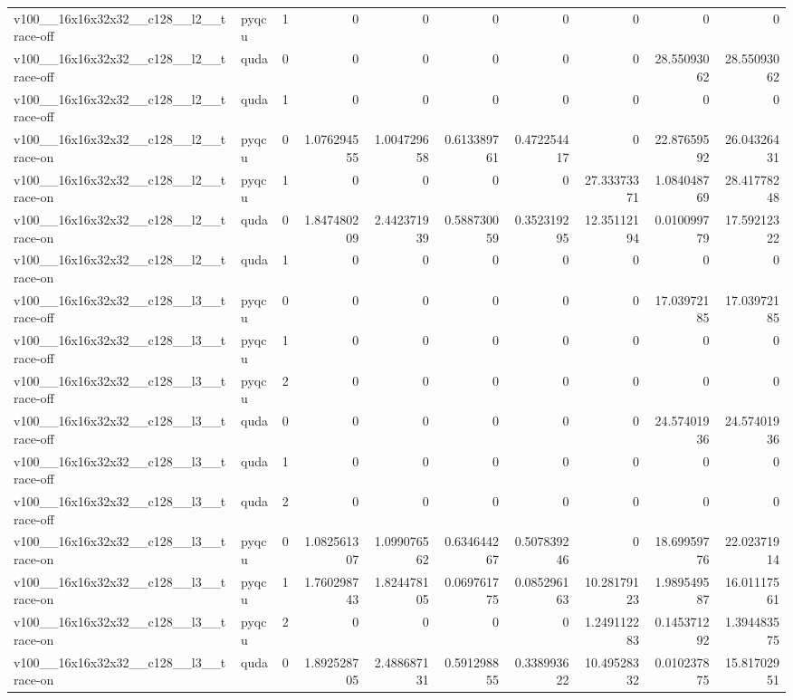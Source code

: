 \begin{table}[htbp]
\begin{tabular}{@{}llrrrrrrrr@{}}
v100\_\_16x16x32x32\_\_c128\_\_l2\_\_trace-off & pyqcu & 1 & 0 & 0 & 0 & 0 & 0 & 0 & 0 \\
v100\_\_16x16x32x32\_\_c128\_\_l2\_\_trace-off & quda & 0 & 0 & 0 & 0 & 0 & 0 & 28.55093062 & 28.55093062 \\
v100\_\_16x16x32x32\_\_c128\_\_l2\_\_trace-off & quda & 1 & 0 & 0 & 0 & 0 & 0 & 0 & 0 \\
v100\_\_16x16x32x32\_\_c128\_\_l2\_\_trace-on & pyqcu & 0 & 1.076294555 & 1.004729658 & 0.613389761 & 0.472254417 & 0 & 22.87659592 & 26.04326431 \\
v100\_\_16x16x32x32\_\_c128\_\_l2\_\_trace-on & pyqcu & 1 & 0 & 0 & 0 & 0 & 27.33373371 & 1.084048769 & 28.41778248 \\
v100\_\_16x16x32x32\_\_c128\_\_l2\_\_trace-on & quda & 0 & 1.847480209 & 2.442371939 & 0.588730059 & 0.352319295 & 12.35112194 & 0.010099779 & 17.59212322 \\
v100\_\_16x16x32x32\_\_c128\_\_l2\_\_trace-on & quda & 1 & 0 & 0 & 0 & 0 & 0 & 0 & 0 \\
v100\_\_16x16x32x32\_\_c128\_\_l3\_\_trace-off & pyqcu & 0 & 0 & 0 & 0 & 0 & 0 & 17.03972185 & 17.03972185 \\
v100\_\_16x16x32x32\_\_c128\_\_l3\_\_trace-off & pyqcu & 1 & 0 & 0 & 0 & 0 & 0 & 0 & 0 \\
v100\_\_16x16x32x32\_\_c128\_\_l3\_\_trace-off & pyqcu & 2 & 0 & 0 & 0 & 0 & 0 & 0 & 0 \\
v100\_\_16x16x32x32\_\_c128\_\_l3\_\_trace-off & quda & 0 & 0 & 0 & 0 & 0 & 0 & 24.57401936 & 24.57401936 \\
v100\_\_16x16x32x32\_\_c128\_\_l3\_\_trace-off & quda & 1 & 0 & 0 & 0 & 0 & 0 & 0 & 0 \\
v100\_\_16x16x32x32\_\_c128\_\_l3\_\_trace-off & quda & 2 & 0 & 0 & 0 & 0 & 0 & 0 & 0 \\
v100\_\_16x16x32x32\_\_c128\_\_l3\_\_trace-on & pyqcu & 0 & 1.082561307 & 1.099076562 & 0.634644267 & 0.507839246 & 0 & 18.69959776 & 22.02371914 \\
v100\_\_16x16x32x32\_\_c128\_\_l3\_\_trace-on & pyqcu & 1 & 1.760298743 & 1.824478105 & 0.069761775 & 0.085296163 & 10.28179123 & 1.989549587 & 16.01117561 \\
v100\_\_16x16x32x32\_\_c128\_\_l3\_\_trace-on & pyqcu & 2 & 0 & 0 & 0 & 0 & 1.249112283 & 0.145371292 & 1.394483575 \\
v100\_\_16x16x32x32\_\_c128\_\_l3\_\_trace-on & quda & 0 & 1.892528705 & 2.488687131 & 0.591298855 & 0.338993622 & 10.49528332 & 0.010237875 & 15.81702951 \\

\end{tabular}
\end{table}
